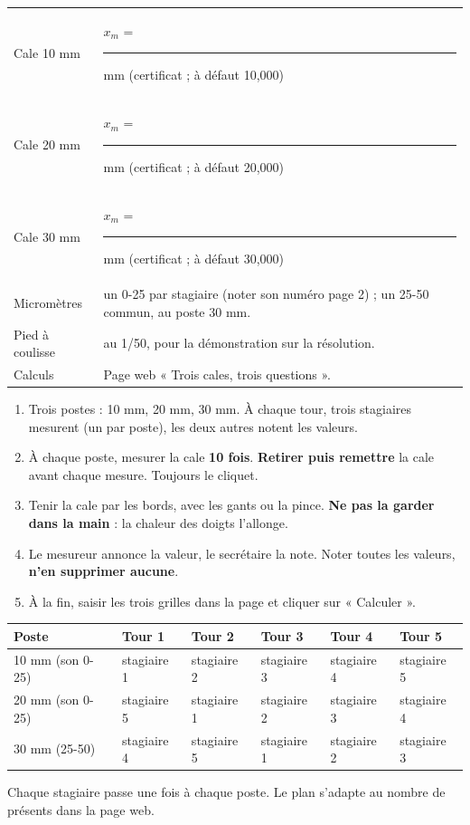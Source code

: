 \documentclass[10pt,a4paper]{article}
\begin{document}
\renewcommand{\arraystretch}{1.35}
\begin{tabularx}{\linewidth}{@{}l X@{}}
Cale 10 mm & $x_m$ = \rule{22mm}{0.3pt} mm \quad (certificat ; à défaut 10,000)\\
Cale 20 mm & $x_m$ = \rule{22mm}{0.3pt} mm \quad (certificat ; à défaut 20,000)\\
Cale 30 mm & $x_m$ = \rule{22mm}{0.3pt} mm \quad (certificat ; à défaut 30,000)\\
Micromètres & un 0-25 par stagiaire (noter son numéro page 2) ; un 25-50 commun, au poste 30 mm.\\
Pied à coulisse & au 1/50, pour la démonstration sur la résolution.\\
Calculs & Page web « Trois cales, trois questions ».\\
\end{tabularx}

\begin{enumerate}[label=\textcolor{cyan}{\textbf{\arabic*.}},leftmargin=15pt]
\item Trois postes : 10 mm, 20 mm, 30 mm. À chaque tour, trois stagiaires mesurent (un par poste), les deux autres notent les valeurs.
\item À chaque poste, mesurer la cale \textbf{10 fois}. \textbf{Retirer puis remettre} la cale avant chaque mesure. Toujours le cliquet.
\item Tenir la cale par les bords, avec les gants ou la pince. \textbf{Ne pas la garder dans la main} : la chaleur des doigts l'allonge.
\item Le mesureur annonce la valeur, le secrétaire la note. Noter toutes les valeurs, \textbf{n'en supprimer aucune}.
\item À la fin, saisir les trois grilles dans la page et cliquer sur « Calculer ».
\end{enumerate}

\renewcommand{\arraystretch}{1.25}
\begin{tabularx}{\linewidth}{@{}l *{5}{>{\centering\arraybackslash}X}@{}}
\toprule
\textbf{Poste} & \textbf{Tour 1} & \textbf{Tour 2} & \textbf{Tour 3} & \textbf{Tour 4} & \textbf{Tour 5}\\\midrule
10 mm (son 0-25) & stagiaire 1 & stagiaire 2 & stagiaire 3 & stagiaire 4 & stagiaire 5\\
20 mm (son 0-25) & stagiaire 5 & stagiaire 1 & stagiaire 2 & stagiaire 3 & stagiaire 4\\
30 mm (25-50) & stagiaire 4 & stagiaire 5 & stagiaire 1 & stagiaire 2 & stagiaire 3\\
\bottomrule
\end{tabularx}
{\small Chaque stagiaire passe une fois à chaque poste. Le plan s'adapte au nombre de présents dans la page web.}
\end{document}
